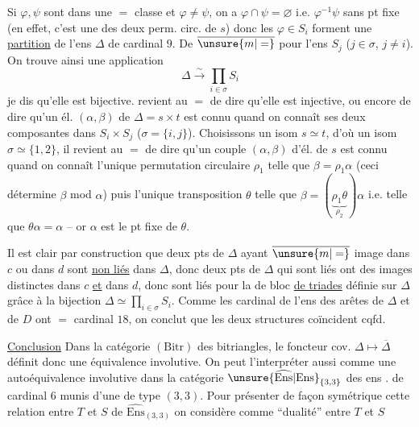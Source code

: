 Si $\varphi,\psi$  sont dans une $=$ classe  et $\varphi\ne\psi$, on a $\varphi\cap\psi=\varnothing$ i.e. $\varphi^{-1}\psi$ sans pt fixe (en effet, c'est une des deux perm. circ. de $s$) donc les  $\varphi\in S_i$ forment une \uline{partition} de l'ens $\Delta$ de cardinal $9$. De $\overline{\unsure{m|=}}$ pour l'ens $S_j$ ($j\in\sigma$, $j\ne i$). On trouve ainsi une application
\[
\Delta\xrightarrow{\sim}\prod_{i\in\sigma}S_i
\]
je dis qu'elle est bijective.  revient au $=$ de dire qu'elle est injective, ou encore de dire qu'un él. $(\alpha,\beta)$ de $\Delta=s\times t$ est connu quand on connaît ses deux composantes dans $S_i\times S_j$ ($\sigma=\{i,j\}$). Choisissons un isom $s\simeq t$, d'où un isom $\sigma\simeq\{1,2\}$,   il revient au $=$ de dire qu'un couple $(\alpha,\beta)$ d'él. de $s$ est connu quand on connaît l'unique permutation circulaire $\rho_1$ telle que $\beta=\rho_1\alpha$ (ceci détermine $\beta$ mod $\alpha$) puis l'unique transposition $\theta$ telle que $\beta=(\underbrace{\rho_1\theta}_{\rho_2})\alpha$ i.e. telle que $\theta\alpha=\alpha$ -- or $\alpha$ est  le  pt fixe de $\theta$.

 Il est clair par construction que deux pts de $\Delta$ ayant $\overline{\unsure{m|=}}$ image dans $c$ ou dans $d$ sont \uline{non liés} dans $\Delta$, donc deux pts de $\Delta$ qui sont liés  ont des images distinctes dans $c$ \uline{et} dans $d$, donc sont liés pour la   de bloc \uline{de triades}  définie sur $\Delta$ grâce à la bijection $\Delta\simeq\prod_{i\in\sigma}S_i$. Comme les cardinal de l'ens des arêtes de $\Delta$ et de $D$ ont $=$ cardinal $18$, on conclut que les deux structures coïncident cqfd.

\uline{Conclusion} Dans la catégorie  $(\mathrm{Bitr})$ des bitriangles, le foncteur cov. $\Delta\longmapsto\overline\Delta$ définit donc une  équivalence involutive. On peut l'interpréter aussi comme une autoéquivalence involutive dans la catégorie $\unsure{\widehat{\mathrm{Ens}}|\mathrm{Ens}}_{\{3,3\}}$ des ens . de cardinal $6$ munis d'une   de type $(3,3)$. Pour présenter de façon symétrique cette relation entre $T$ et $S$ de $\widehat{\mathrm{Ens}}_{(3,3)}$ on considère comme ``dualité'' entre $T$ et $S$
